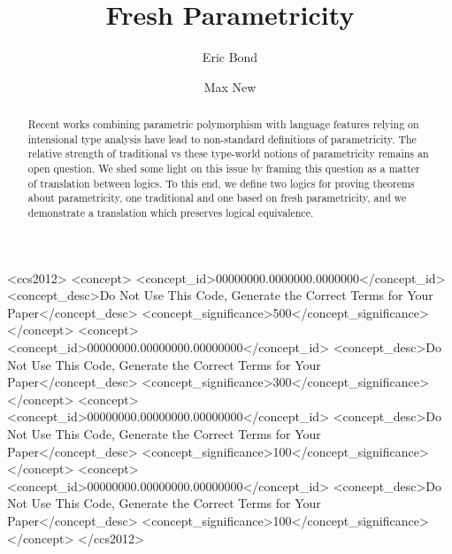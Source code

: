 \documentclass[acmsmall]{acmart}
\begin{document}
\title{Fresh Parametricity}


\author{Eric Bond}

\author{Max New}



\begin{abstract}
Recent works combining parametric polymorphism with language features relying on intensional type analysis have lead to non-standard definitions of parametricity. The relative strength of traditional vs these type-world notions of parametricity remains an open question. We shed some light on this issue by framing this question as a matter of translation between logics. To this end, we define two logics for proving theorems about parametricity, one traditional and one based on fresh parametricity, and we demonstrate a translation which preserves logical equivalence. 

\end{abstract}

\begin{CCSXML}
<ccs2012>
 <concept>
  <concept_id>00000000.0000000.0000000</concept_id>
  <concept_desc>Do Not Use This Code, Generate the Correct Terms for Your Paper</concept_desc>
  <concept_significance>500</concept_significance>
 </concept>
 <concept>
  <concept_id>00000000.00000000.00000000</concept_id>
  <concept_desc>Do Not Use This Code, Generate the Correct Terms for Your Paper</concept_desc>
  <concept_significance>300</concept_significance>
 </concept>
 <concept>
  <concept_id>00000000.00000000.00000000</concept_id>
  <concept_desc>Do Not Use This Code, Generate the Correct Terms for Your Paper</concept_desc>
  <concept_significance>100</concept_significance>
 </concept>
 <concept>
  <concept_id>00000000.00000000.00000000</concept_id>
  <concept_desc>Do Not Use This Code, Generate the Correct Terms for Your Paper</concept_desc>
  <concept_significance>100</concept_significance>
 </concept>
</ccs2012>
\end{CCSXML}

\end{document}
